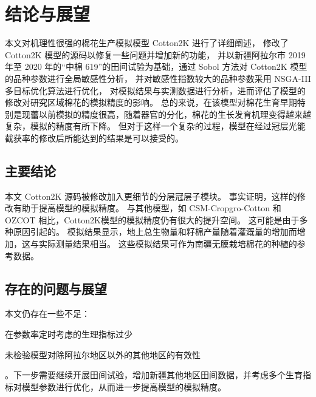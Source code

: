 \chapter{结论与展望}
本文对机理性很强的棉花生产模拟模型 Cotton2K 进行了详细阐述，%
修改了 Cotton2K 模型的源码以修复一些问题并增加新的功能，%
并以新疆阿拉尔市 2019年至 2020 年的“中棉 619”的田间试验为基础，通过 Sobol 方法对 Cotton2K 模型的品种参数进行全局敏感性分析，%
并对敏感性指数较大的品种参数采用 NSGA-III 多目标优化算法进行优化，%
对模拟结果与实测数据进行分析，进而评估了模型的修改对研究区域棉花的模拟精度的影响。%
总的来说，在该模型对棉花生育早期特别是现蕾以前模拟的精度很高，随着器官的分化，棉花的生长发育机理变得越来越复杂，模拟的精度有所下降。%
但对于这样一个复杂的过程，模型在经过冠层光能截获率的修改后所能达到的结果是可以接受的。%

\section{主要结论}

本文 Cotton2K 源码被修改加入更细节的分层冠层子模块。%
事实证明，这样的修改有助于提高模型的模拟精度。
与其他模型，如 CSM-Cropgro-Cotton 和 OZCOT 相比，Cotton2K模型的模拟精度仍有很大的提升空间。%
这可能是由于多种原因引起的。%
模拟结果显示，地上总生物量和籽棉产量随着灌溉量的增加而增加，这与实际测量结果相当。%
这些模拟结果可作为南疆无膜栽培棉花的种植的参考数据。

\section{存在的问题与展望}

本文仍存在一些不足：
\begin{enumerate*}
    \item 在参数率定时考虑的生理指标过少
    \item 未检验模型对除阿拉尔地区以外的其他地区的有效性
\end{enumerate*}。下一步需要继续开展田间试验，增加新疆其他地区田间数据，并考虑多个生育指标对模型参数进行优化，从而进一步提高模型的模拟精度。